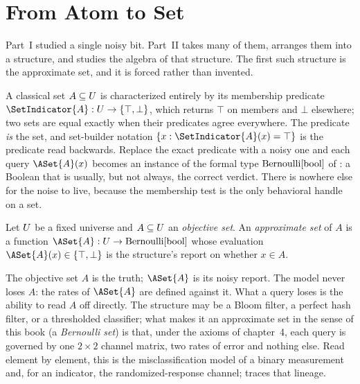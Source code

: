 %

\section{From Atom to Set}
\label{sec:from-atom-to-set}

Part~I studied a single noisy bit. Part~II takes many of them, arranges
them into a structure, and studies the algebra of that structure. The
first such structure is the approximate set, and it is forced rather than
invented.

A classical set $A \subseteq U$ is characterized entirely by its
membership predicate $\SetIndicator{A} : \Universe \to \{\top, \bot\}$,
which returns $\top$ on members and $\bot$ elsewhere; two sets are equal
exactly when their predicates agree everywhere. The predicate \emph{is}
the set, and set-builder notation $\{x : \SetIndicator{A}(x) = \top\}$ is
the predicate read backwards. Replace the exact predicate with a noisy
one and each query $\ASet{A}(x)$ becomes an instance of the formal type
$\mathrm{Bernoulli}[\mathrm{bool}]$ of : a Boolean that is
usually, but not always, the correct verdict. There is nowhere else for
the noise to live, because the membership test is the only behavioral
handle on a set.

\begin{definition}
\label{def:approximate-set}
Let $U$ be a fixed universe and $A \subseteq U$ an
\emph{objective set}. An \emph{approximate set} of $A$ is a function
$\ASet{A} : \Universe \to \Bernoulli{\BoolType}$ whose evaluation
$\ASet{A}(x) \in \{\top, \bot\}$ is the structure's report on whether
$x \in A$.
\end{definition}

The objective set $A$ is the truth; $\ASet{A}$ is its noisy report. The
model never loses $A$: the rates of $\ASet{A}$ are defined against it.
What a query loses is the ability to read $A$ off directly. The structure
may be a Bloom filter, a perfect hash filter, or a thresholded
classifier; what makes it an approximate set in the sense of this book
(a \emph{Bernoulli set}) is that, under the axioms of
chapter~4, each query is governed by one $2 \times 2$ channel
matrix, two rates of error and nothing else. Read
element by element, this is the misclassification model of a binary
measurement and, for an indicator, the randomized-response
channel;  traces that
lineage.


